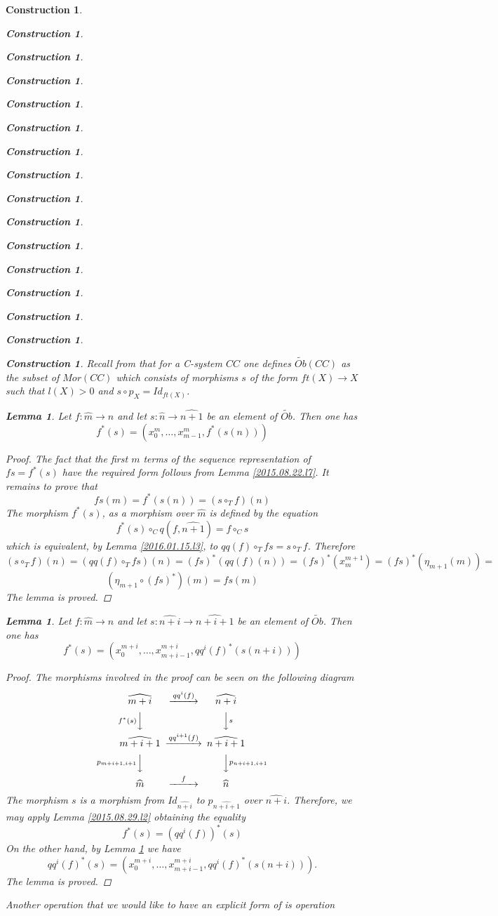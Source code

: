 \documentclass[12pt]{amsart}
\newenvironment{eq}{\begin{equation}}{\end{equation}}
\newtheorem{lemma}[proposition]{Lemma}
\newtheorem{construction}[proposition]{Construction}
\newcommand{\llabel}[1]{\label{#1}}
\newcommand{\sr}{\rightarrow}
\newcommand{\wt}{\widetilde}
\newcommand{\wh}{\widehat}
\newcommand{\mbind}[1]{{#1^*}}
\newcommand{\hc}{\circ_{T}}
\begin{document}
\begin{construction}
\begin{construction}
\begin{construction}
\begin{construction}
\begin{construction}
\begin{construction}
\begin{construction}
\begin{construction}
\begin{construction}
\begin{construction}
\begin{construction}
\begin{construction}
\begin{construction}
\begin{construction}
\begin{construction}
\begin{construction}
Recall from \cite{Csubsystems} that for a C-system $CC$ one defines
$\wt{Ob}(CC)$ as the subset of $Mor(CC)$ which consists of morphisms $s$ of the
form $ft(X)\sr X$ such that $l(X)>0$ and $s\circ p_X=Id_{ft(X)}$.
%
\begin{lemma}
\llabel{2015.08.24.l1}
Let $f:\wh{m}\sr\wh{n}$ and let $s:\wh{n}\sr\wh{n+1}$ be an element of $\wt{Ob}$. Then one has
%
$$f^*(s)=(x_0^m,\dots,x_{m-1}^m,\mbind{f}(s(n)))$$
%
\end{lemma}
%
\begin{proof}
The fact that the first $m$ terms of the sequence representation of $fs=f^*(s)$
have the required form follows from Lemma \ref{2015.08.22.l7}. It remains to
prove that
%
$$fs(m)=\mbind{f}(s(n))=(s\hc f)(n)$$
%
The morphism $f^*(s)$, as a morphism over $\wh{m}$ is defined by the equation
%
$$f^*(s)\circ_C q(f,\wh{n+1})=f\circ_C s$$
%
which is equivalent, by Lemma \ref{2016.01.15.l3},  to $qq(f)\hc fs=s\hc f$. Therefore 
%
$$(s\hc f)(n)=(qq(f)\hc fs)(n)=\mbind{(fs)}(qq(f)(n))=\mbind{(fs)}(x_m^{m+1})=\mbind{(fs)}(\eta_{m+1}(m))=$$$$(\eta_{m+1}\circ\mbind{(fs)})(m)=fs(m)$$ 
%
The lemma is proved.
\end{proof}
%
\begin{lemma}
\llabel{2015.08.29.l1}
Let $f:\wh{m}\sr\wh{n}$ and let $s:\wh{n+i}\sr\wh{n+i+1}$ be an element of $\wt{Ob}$. Then one has
%
\begin{eq}\llabel{2015.08.29.eq1}
f^*(s)=(x_0^{m+i},\dots,x_{m+i-1}^{m+i},\mbind{qq^i(f)}(s(n+i)))
\end{eq}%
%
\end{lemma}
%
\begin{proof}
The morphisms involved in the proof can be seen on the following diagram
%
$$
\begin{CD}
\wh{m+i} @>qq^i(f)>> \wh{n+i}\\
@Vf^*(s)VV @VVsV\\
\wh{m+i+1} @>qq^{i+1}(f)>> \wh{n+i+1}\\
@Vp_{m+i+1,i+1}VV @VVp_{n+i+1,i+1}V\\
\wh{m} @>f>> \wh{n}
\end{CD}
$$
%
The morphism $s$ is a morphism from $Id_{\wh{n+i}}$ to $p_{\wh{n+i+1}}$ over
$\wh{n+i}$. Therefore, we may apply Lemma \ref{2015.08.29.l2} obtaining the
equality
%
$$f^*(s)=(qq^i(f))^*(s)$$
%
On the other hand, by Lemma \ref{2015.08.24.l1} we have
%
$$qq^i(f)^*(s)=(x_0^{m+i},\dots,x_{m+i-1}^{m+i},\mbind{qq^i(f)}(s(n+i))).$$
%
The lemma is proved. 
\end{proof}
%
Another operation that we would like to have an explicit form of is operation

\end{construction}
\end{construction}
\end{construction}
\end{construction}
\end{construction}
\end{construction}
\end{construction}
\end{construction}
\end{construction}
\end{construction}
\end{construction}
\end{construction}
\end{construction}
\end{construction}
\end{construction}
\end{construction}
\end{document}
